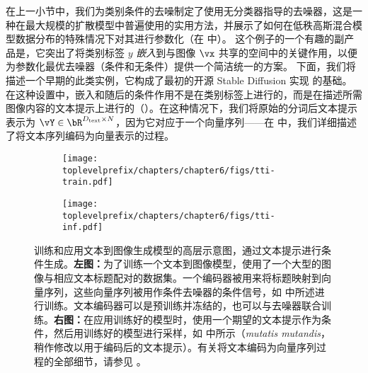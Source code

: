 \documentclass[../../book-main_zh.tex]{subfiles}
\begin{document}
在上一小节中，我们为类别条件的去噪制定了使用无分类器指导的去噪器，这是一种在最大规模的扩散模型中普遍使用的实用方法，并展示了如何在低秩高斯混合模型数据分布的特殊情况下对其进行参数化（在  中）。
这个例子的一个有趣的副产品是，它突出了将类别标签 $y$ \textit{嵌入}到与图像 $\vx$ 共享的空间中的关键作用，以便为参数化最优去噪器（条件和无条件）提供一个简洁统一的方案。
下面，我们将描述一个早期的此类实例，它构成了最初的开源 Stable Diffusion 实现 \cite{rombach2022high} 的基础。
在这种设置中，嵌入和随后的条件作用不是在类别标签上进行的，而是在描述所需图像内容的文本提示上进行的（）。在这种情况下，我们将原始的分词后文本提示表示为 $\vY \in \bR^{D_{\mathrm{text}} \times N}$，因为它对应于一个向量序列——在  中，我们详细描述了将文本序列编码为向量表示的过程。

\begin{figure}[tbp]
  \centering
  \begin{subfigure}{0.47\textwidth}
    \texttt{[image: \\toplevelprefix/chapters/chapter6/figs/tti-train.pdf]}
    \caption{}
  \end{subfigure}
  \hfill
  \begin{subfigure}{0.47\textwidth}
    \texttt{[image: \\toplevelprefix/chapters/chapter6/figs/tti-inf.pdf]}
    \caption{}
  \end{subfigure}

  \caption{训练和应用文本到图像生成模型的高层示意图，通过文本提示进行条件生成。\textbf{左图：}为了训练一个文本到图像模型，使用了一个大型的图像与相应文本标题配对的数据集。一个编码器被用来将标题映射到向量序列，这些向量序列被用作条件去噪器的条件信号，如  中所述进行训练。文本编码器可以是预训练并冻结的，也可以与去噪器联合训练。\textbf{右图：}在应用训练好的模型时，使用一个期望的文本提示作为条件，然后用训练好的模型进行采样，如  中所示（\textit{mutatis mutandis}，稍作修改以用于编码后的文本提示）。有关将文本编码为向量序列过程的全部细节，请参见 。}
  \label{fig:text-to-image}
\end{figure}
\end{document}
